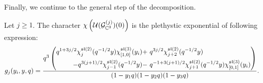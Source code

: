 \parsec[]
Finally, we continue to the general step of the decomposition.

\begin{prop}
Let $j\geq 1$. The character $\chi \left( \mathcal{U}(\mathcal{G}^{(j)} _{\mathbb{C}^3}) (0)\right )$  is the plethystic exponential of following expression:
\begin{equation}\label{eqn:6dtwo}
g_{j} (y_i,y,q) =  \frac{ q^{3} \left( \begin{aligned} q^{1 + 3 j/2} \chi^{\mathfrak{sl}(2)}_{j}(q^{-1/2} y)\chi^{\mathfrak{sl}(3)}_{[1,0]}(y_i) + \  & q^{3j/2} \chi^{\mathfrak{sl}(2)}_{j+2}(q^{-1/2} y)  \\
 - q^{3(j+1)/2} \chi^{\mathfrak{sl}(2)}_{j-1}(q^{-1/2}y) - \ & q^{-1 + 3(j+1)/2} \chi^{\mathfrak{sl}(2)}_{j+1} (q^{-1/2} y) \chi^{\mathfrak{sl}(3)}_{[0,1]}(y_i) \end{aligned} \right)}{(1-y_1 q)(1-y_2q)(1-y_3q)}.
\end{equation}
\end{prop}
